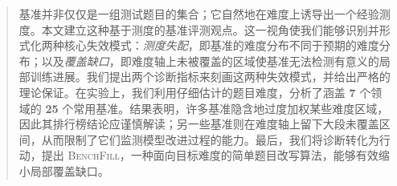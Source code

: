 \begin{abstract}
  基准并非仅仅是一组测试题目的集合；它自然地在难度上诱导出一个经验测度。本文建立这种基于测度的基准评测观点。这一视角使我们能够识别并形式化两种核心失效模式：\emph{测度失配}，即基准的难度分布不同于预期的难度分布；以及\emph{覆盖缺口}，即难度轴上未被覆盖的区域使基准无法检测有意义的局部训练进展。我们提出两个诊断指标来刻画这两种失效模式，并给出严格的理论保证。在实验上，我们利用仔细估计的题目难度，分析了涵盖 \textbf{7} 个领域的 \textbf{25} 个常用基准。结果表明，许多基准隐含地过度加权某些难度区域，因此其排行榜结论应谨慎解读；另一些基准则在难度轴上留下大段未覆盖区间，从而限制了它们监测模型改进过程的能力。最后，我们将诊断转化为行动，提出 \textsc{BenchFill}，一种面向目标难度的简单题目改写算法，能够有效缩小局部覆盖缺口。
\end{abstract}
